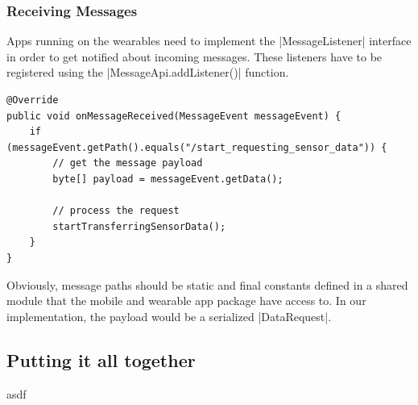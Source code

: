 \subsubsection{Receiving Messages}
\label{sec:implementation:transferringdata:receive}

Apps running on the wearables need to implement the |MessageListener|\cite{androiddocs:messagelistener} interface in order to get notified about incoming messages. These listeners have to be registered using the |MessageApi.addListener()| function.

\begin{lstlisting}[label=receivemessage]
@Override
public void onMessageReceived(MessageEvent messageEvent) {
    if (messageEvent.getPath().equals("/start_requesting_sensor_data")) {
        // get the message payload
        byte[] payload = messageEvent.getData();

        // process the request
        startTransferringSensorData();
    }
}
\end{lstlisting}

Obviously, message paths should be static and final constants defined in a shared module that the mobile and wearable app package have access to. In our implementation, the payload would be a serialized |DataRequest|.


\subsection{Putting it all together}
asdf


\clearpage